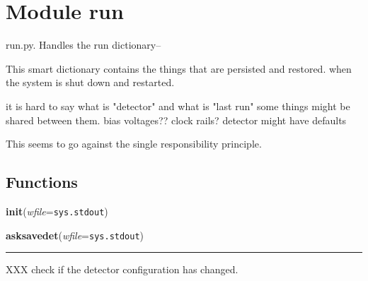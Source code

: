 %
%
%


\section{Module run}

    \label{run}
run.py. Handles the run dictionary--

This smart dictionary contains the things that are persisted and restored. 
when the system is shut down and restarted.

it is hard to say what is "detector" and what is "last run" some things 
might be shared between them. bias voltages?? clock rails? detector might 
have defaults

This seems to go against the single responsibility principle.



  \subsection{Functions}

    \label{run:init}

    \vspace{0.5ex}

    \begin{boxedminipage}{\textwidth}

    \raggedright \textbf{init}(\textit{wfile}=\texttt{sys.stdout})

    \end{boxedminipage}

    \label{run:asksavedet}

    \vspace{0.5ex}

    \begin{boxedminipage}{\textwidth}

    \raggedright \textbf{asksavedet}(\textit{wfile}=\texttt{sys.stdout})

    \vspace{-1.5ex}

    \rule{\textwidth}{0.5\fboxrule}
    XXX check if the detector configuration has changed.

    \vspace{1ex}

    \end{boxedminipage}

